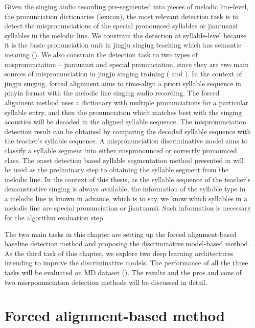 Given the singing audio recording pre-segmented into pieces of melodic line-level, the pronunciation dictionaries (lexicon), the most relevant detection task is to detect the mispronunciations of the special pronounced syllables or \gls{jiantuanzi} syllables in the melodic line. We constrain the detection at syllable-level because it is the basic pronunciation unit in jingju singing teaching which has semantic meaning (). We also constrain the detection task to two types of mispronunciation -- \gls{jiantuanzi} and special pronunciation, since they are two main sources of mispronunciation in jingju singing training ( and ). In the context of jingju singing, forced alignment aims to time-align a priori syllable sequence in pinyin format with the melodic line singing audio recording. The forced alignment method uses a dictionary with multiple pronunciations for a particular syllable entry, and then the pronunciation which matches best with the singing acoustics will be decoded in the aligned syllable sequence. The mispronunciation detection result can be obtained by comparing the decoded syllable sequence with the teacher's syllable sequence. A mispronunciation discriminative model aims to classify a syllable segment into either mispronounced or correctly pronounced class. The onset detection based syllable segmentation method presented in  will be used as the preliminary step to obtaining the syllable segment from the melodic line. In the context of this thesis, as the syllable sequence of the teacher's demonstrative singing is always available, the information of the syllable type in a melodic line is known in advance, which is to say, we know which syllables in a melodic line are special pronunciation or \gls{jiantuanzi}. Such information is necessary for the algorithm evaluation step.

The two main tasks in this chapter are setting up the forced alignment-based baseline detection method and proposing the discriminative model-based method. As the third task of this chapter, we explore two deep learning architectures intending to improve the discriminative models. The performance of all the three tasks will be evaluated on MD dataset (). The results and the pros and cons of two misrponunciation detection methods will be discussed in detail.

\section{Forced alignment-based method}\label{sec:ch6:forced_alignment}


